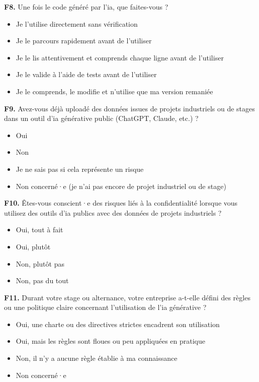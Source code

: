 \textbf{F8.} Une fois le code généré par l'\gls{ia}, que faites-vous ?
\begin{itemize}[label=$\square$, leftmargin=1.5cm]
  \item Je l'utilise directement sans vérification
  \item Je le parcours rapidement avant de l'utiliser
  \item Je le lis attentivement et comprends chaque ligne avant de
        l'utiliser
  \item Je le valide à l'aide de tests avant de l'utiliser
  \item Je le comprends, le modifie et n'utilise que ma version remaniée
\end{itemize}

\textbf{F9.} Avez-vous déjà uploadé des données issues de projets
industriels ou de stages dans un outil d'\gls{ia} générative public
(ChatGPT, Claude, etc.) ?
\begin{itemize}[label=$\square$, leftmargin=1.5cm]
  \item Oui
  \item Non
  \item Je ne sais pas si cela représente un risque
  \item Non concerné·e (je n'ai pas encore de projet industriel ou de
        stage)
\end{itemize}
 
\textbf{F10.} Êtes-vous conscient·e des risques liés à la confidentialité
lorsque vous utilisez des outils d'\gls{ia} publics avec des données de
projets industriels ?
\begin{itemize}[label=$\square$, leftmargin=1.5cm]
  \item Oui, tout à fait
  \item Oui, plutôt
  \item Non, plutôt pas
  \item Non, pas du tout
\end{itemize}

\textbf{F11.} Durant votre stage ou alternance, votre entreprise a-t-elle
défini des règles ou une politique claire concernant l'utilisation de
l'\gls{ia} générative ?
\begin{itemize}[label=$\square$, leftmargin=1.5cm]
  \item Oui, une charte ou des directives strictes encadrent son utilisation
  \item Oui, mais les règles sont floues ou peu appliquées en pratique
  \item Non, il n'y a aucune règle établie à ma connaissance
  \item Non concerné·e
\end{itemize}

